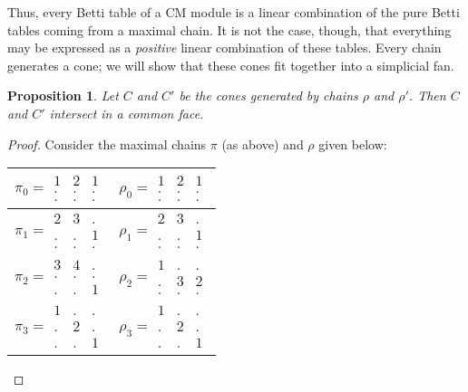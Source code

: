 \documentclass[12pt]{amsart}
\theoremstyle{plain}
\newtheorem{proposition}[thm]{Proposition}
\theoremstyle{definition}
\theoremstyle{remark}
\begin{document}
Thus, every Betti table of a CM module is a linear combination of the
pure Betti tables coming from a maximal chain.  It is not the case,
though, that everything may be expressed as a \emph{positive} linear
combination of these tables.  Every chain generates a cone; we will
show that these cones fit together into a simplicial fan.

\begin{proposition} Let $C$ and $C'$ be the cones generated by chains
  $\rho$ and $\rho'$.  Then $C$ and $C'$ intersect in a common face.
\end{proposition}

\begin{proof}  
Consider the maximal chains $\pi$ (as above) and $\rho$ given below:
\begin{tabular}{c|c}
$\pi_0=\begin{array}{ccc}1&2&1\\.&.&.\\.&.&.\end{array}$&$\rho_0=\begin{array}{ccc}1&2&1\\.&.&.\\.&.&.\end{array}$\\\hline
$\pi_1=\begin{array}{ccc}2&3&.\\.&.&1\\.&.&.\end{array}$&$\rho_1=\begin{array}{ccc}2&3&.\\.&.&1\\.&.&.\end{array}$\\\hline
$\pi_2=\begin{array}{ccc}3&4&.\\.&.&.\\.&.&1\end{array}$&$\rho_2=\begin{array}{ccc}1&.&.\\.&3&2\\.&.&.\end{array}$\\\hline
$\pi_3=\begin{array}{ccc}1&.&.\\.&2&.\\.&.&1\end{array}$&$\rho_3=\begin{array}{ccc}1&.&.\\.&2&.\\.&.&1\end{array}$\\\hline

\end{tabular}
\end{proof}
\end{document}
